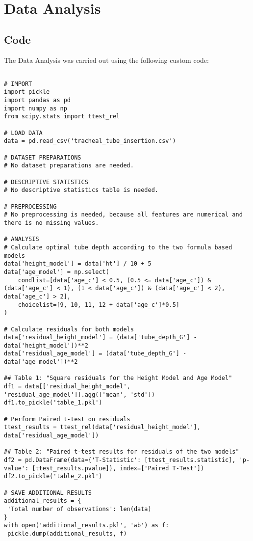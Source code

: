 \documentclass[11pt]{article}
\begin{document}
\section{Data Analysis}
\subsection{{Code}}
The Data Analysis was carried out using the following custom code:

\begin{verbatim}

# IMPORT
import pickle
import pandas as pd
import numpy as np
from scipy.stats import ttest_rel

# LOAD DATA
data = pd.read_csv('tracheal_tube_insertion.csv')

# DATASET PREPARATIONS
# No dataset preparations are needed.

# DESCRIPTIVE STATISTICS
# No descriptive statistics table is needed.

# PREPROCESSING 
# No preprocessing is needed, because all features are numerical and there is no missing values.

# ANALYSIS
# Calculate optimal tube depth according to the two formula based models
data['height_model'] = data['ht'] / 10 + 5
data['age_model'] = np.select(
    condlist=[data['age_c'] < 0.5, (0.5 <= data['age_c']) & (data['age_c'] < 1), (1 < data['age_c']) & (data['age_c'] < 2), data['age_c'] > 2],
    choicelist=[9, 10, 11, 12 + data['age_c']*0.5]
)

# Calculate residuals for both models
data['residual_height_model'] = (data['tube_depth_G'] - data['height_model'])**2
data['residual_age_model'] = (data['tube_depth_G'] - data['age_model'])**2

## Table 1: "Square residuals for the Height Model and Age Model"
df1 = data[['residual_height_model', 'residual_age_model']].agg(['mean', 'std'])
df1.to_pickle('table_1.pkl')

# Perform Paired t-test on residuals
ttest_results = ttest_rel(data['residual_height_model'], data['residual_age_model'])

## Table 2: "Paired t-test results for residuals of the two models"
df2 = pd.DataFrame(data={'T-Statistic': [ttest_results.statistic], 'p-value': [ttest_results.pvalue]}, index=['Paired T-Test'])
df2.to_pickle('table_2.pkl')

# SAVE ADDITIONAL RESULTS
additional_results = {
 'Total number of observations': len(data)
}
with open('additional_results.pkl', 'wb') as f:
 pickle.dump(additional_results, f)

\end{verbatim}
\end{document}
